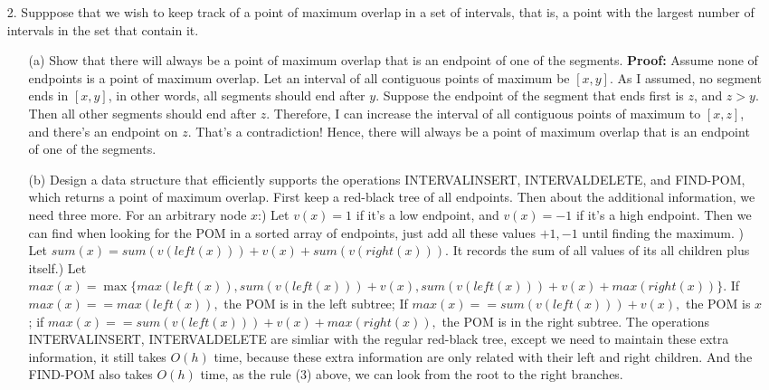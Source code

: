 \documentclass{article}       %
\begin{document}
\begin{enumerate}
\begin{enumerate}
	\end{enumerate}
	\item[2.] Supppose that we wish to keep track of a point of maximum overlap in a set of intervals, that is, a point with the largest number of intervals in the set that contain it.
	\begin{enumerate}
		\item[(a)] Show that there will always be a point of maximum overlap that is an endpoint of one of the segments.\newline\newline
		\textbf{Proof:} Assume none of endpoints is a point of maximum overlap. Let an interval of all contiguous points of maximum be $[x, y]$. As I assumed, no segment ends in $[x, y]$, in other words, all segments should end after $y$. Suppose the endpoint of the segment that ends first is $z$, and $z > y$. Then all other segments should end after $z$. Therefore, I can increase the interval of all contiguous points of maximum to $[x, z]$, and there's an endpoint on $z$. That's a contradiction! Hence, there will always be a point of maximum overlap that is an endpoint of one of the segments.\newline
		\item[(b)] Design a data structure that efficiently supports the operations INTERVALINSERT, INTERVALDELETE, and FIND-POM, which returns a point of maximum overlap.\newline\newline
		First keep a red-black tree of all endpoints. Then about the additional information, we need three more. For an arbitrary node $x$:) Let $v(x) = 1$ if it's a low endpoint, and $v(x) = -1$ if it's a high endpoint. Then we can find when looking for the POM in a sorted array of endpoints, just add all these values $+1, -1$ until finding the maximum. ) Let $sum(x) = sum(v(left(x))) + v(x) + sum(v(right(x)))$. It records the sum of all values of its all children plus itself.) Let $max(x) = \max\{max(left(x)), sum(v(left(x))) + v(x), sum(v(left(x))) + v(x) + max(right(x))\}$. If $max(x) == max(left(x)),$ the POM is in the left subtree; If $max(x) == sum(v(left(x))) + v(x),$ the POM is $x$; if $max(x) == sum(v(left(x))) + v(x) + max(right(x)),$ the POM is in the right subtree.\newline
		The operations INTERVALINSERT, INTERVALDELETE are simliar with the regular red-black tree, except we need to maintain these extra information, it still takes $O(h)$ time, because these extra information are only related with their left and right children. And the FIND-POM also takes $O(h)$ time, as the rule (3) above, we can look from the root to the right branches.\newline

\end{enumerate}
\end{enumerate}
\end{document}
